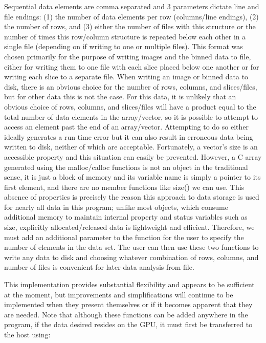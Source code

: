 \documentclass{article}
\begin{document}
Sequential data elements are comma separated and 3 parameters dictate line and file endings: (1) the number of data elements per row (columns/line endings), (2) the number of rows, and (3) either the number of files with this structure or the number of times this row/column structure is repeated below each other in a single file (depending on if writing to one or multiple files).  This format was chosen primarily for the purpose of writing images and the binned data to file, either for writing them to one file with each slice placed below one another or for writing each slice to a separate file.  When writing an image or binned data to disk, there is an obvious choice for the number of rows, columns, and slices/files, but for other data this is not the case.  For this data, it is unlikely that an obvious choice of rows, columns, and slices/files will have a product equal to the total number of data elements in the array/vector, so it is possible to attempt to access an element past the end of an array/vector.  Attempting to do so either ideally generates a run time error but it can also result in erroneous data being written to disk, neither of which are acceptable.  Fortunately, a vector's size is an accessible property and this situation can easily be prevented.  However, a C array generated using the malloc/calloc functions is not an object in the traditional sense, it is just a block of memory and its variable name is simply a pointer to its first element, and there are no member functions like size() we can use.  This absence of properties is precisely the reason this approach to data storage is used for nearly all data in this program; unlike most objects, which consume additional memory to maintain internal property and status variables such as size, explicitly allocated/released data is lightweight and efficient.  Therefore, we must add an additional parameter to the function for the user to specify the number of elements in the data set.  The user can then use these two functions to write any data to disk and choosing whatever combination of rows, columns, and number of files is convenient for later data analysis from file.

This implementation provides substantial flexibility and appears to be sufficient at the moment, but improvements and simplifications will continue to be implemented when they present themselves or if it becomes apparent that they are needed.  Note that although these functions can be added anywhere in the program, if the data desired resides on the GPU, it must first be transferred to the host using:
\end{document}
